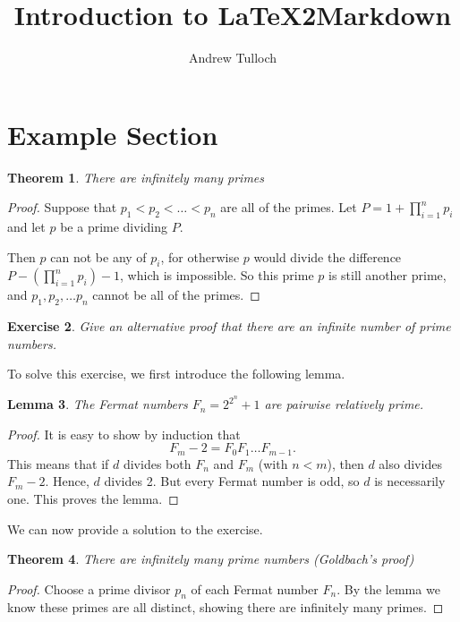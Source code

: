\documentclass[12pt]{amsart}
\title{Introduction to LaTeX2Markdown}
\author{Andrew Tulloch}
\theoremstyle{plain}%
\newtheorem{thm}{Theorem}[section]
\newtheorem{lem}[thm]{Lemma}
\newtheorem{exer}[thm]{Exercise}
\begin{document}
\maketitle

\section{Example Section}
\begin{thm}
    There are infinitely many primes
\end{thm}

\begin{proof}
    Suppose that $p_1 < p_2 < \dots < p_n$ are all of the primes. Let $P = 1 + \prod_{i=1}^n p_i$ and let $p$ be a prime dividing $P$.
    
    Then $p$ can not be any of $p_i$, for otherwise $p$ would divide the difference $P - \left(\prod_{i=1}^n p_i \right) - 1$, which is impossible. So this prime $p$ is still another prime, and $p_1, p_2, \dots p_n$ cannot be all of the primes.
\end{proof}

\begin{exer}
    Give an alternative proof that there are an infinite number of prime numbers.
\end{exer}

To solve this exercise, we first introduce the following lemma.
\begin{lem}
    The Fermat numbers $F_n = 2^{2^{n}} + 1$ are pairwise relatively prime.
\end{lem}

\begin{proof}
    It is easy to show by induction that \[
    F_m - 2 = F_0 F_1 \dots F_{m-1}.
    \]  This means that if $d$ divides both $F_n$ and $F_m$ (with $n < m$), then $d$ also divides $F_m - 2$.  Hence, $d$ divides 2.  But every Fermat number is odd, so $d$ is necessarily one.  This proves the lemma.
\end{proof}

We can now provide a solution to the exercise.

\begin{thm}
    There are infinitely many prime numbers (Goldbach's proof) 
\end{thm}

\begin{proof}
    Choose a prime divisor $p_n$ of each Fermat number $F_n$.  By the lemma we know these primes are all distinct, showing there are infinitely many primes.
\end{proof}
\end{document}
